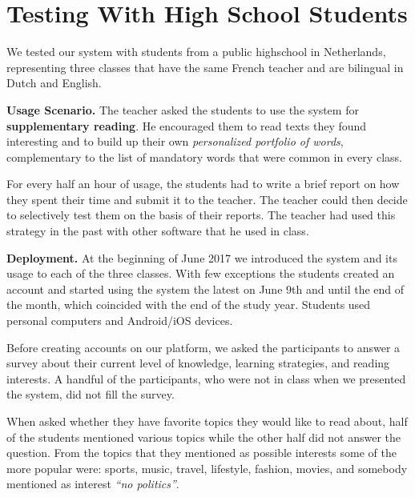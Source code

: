 
\section{Testing With High School Students}
\label{sec:demographics}

We tested our system with \stcnt students from a public highschool in Netherlands, representing three classes that have the same French teacher and are bilingual in Dutch and English. 

{\bf Usage Scenario. }
	The teacher asked the students to use the system for {\bf supplementary reading}. 
	He encouraged them to read texts they found interesting and to build up their own {\em personalized portfolio of words}, complementary to the list of mandatory words that were common in every class.
	
	For every half an hour of usage, the students had to write a brief report on how they spent their time and submit it to the teacher. The teacher could then decide to selectively test them on the basis of their reports. 
	The teacher had used this strategy in the past with other software that he used in class. 


{\bf Deployment.} At the beginning of June 2017 we introduced the system and its usage to each of the three classes. With few exceptions the students created an account and started using the system the latest on June 9th and until the end of the month, which coincided with the end of the study year. 
Students used personal computers and Android/iOS devices.

Before creating accounts on our platform, we asked the participants to answer a survey about their current level of knowledge, learning strategies, and reading interests. A handful of the participants, who were not in class when we presented the system, did not fill the survey.

When asked whether they have favorite topics they would like to read about, half of the students mentioned various topics while the other half did not answer the question. From the topics that they mentioned as possible interests some of the more popular were: sports, music, travel, lifestyle, fashion, movies, and somebody mentioned as interest {\em ``no politics''}.


